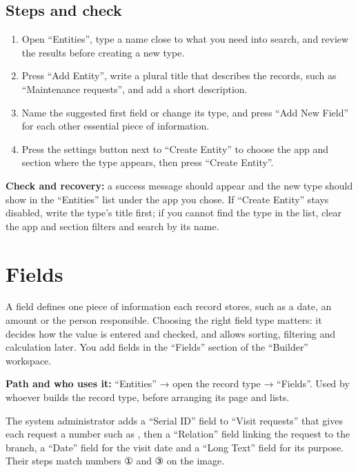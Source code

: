 \subsection{Steps and check}
\begin{enumerate}
\item Open “Entities”, type a name close to what you need into search, and review the results before creating a new type.
\item Press “Add Entity”, write a plural title that describes the records, such as “Maintenance requests”, and add a short description.
\item Name the suggested first field or change its type, and press “Add New Field” for each other essential piece of information.
\item Press the settings button next to “Create Entity” to choose the app and section where the type appears, then press “Create Entity”.
\end{enumerate}

\textbf{Check and recovery:} a success message should appear and the new type should show in the “Entities” list under the app you chose. If “Create Entity” stays disabled, write the type's title first; if you cannot find the type in the list, clear the app and section filters and search by its name.

\clearpage
\section{Fields}
\label{sec:builder-feature-fields}

A field defines one piece of information each record stores, such as a date, an amount or the person responsible. Choosing the right field type matters: it decides how the value is entered and checked, and allows sorting, filtering and calculation later. You add fields in the “Fields” section of the “Builder” workspace.

\textbf{Path and who uses it:} “Entities” → open the record type → “Fields”. Used by whoever builds the record type, before arranging its page and lists.

\begin{rcnote}
The system administrator adds a “Serial ID” field to “Visit requests” that gives each request a number such as , then a “Relation” field linking the request to the branch, a “Date” field for the visit date and a “Long Text” field for its purpose. Their steps match numbers ① and ③ on the image.
\end{rcnote}

